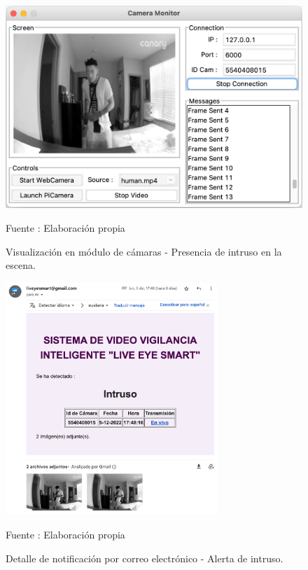 \begin{figure}[H]
    \begin{center}
        \includegraphics[width=12cm]{img/capitulo_6/human.png}
    \end{center}
    \begin{center}
        \caption{Visualización en módulo de cámaras - Presencia de intruso en la escena.}
        Fuente : Elaboración propia
    \end{center}
\end{figure}

\begin{figure}[H]
    \begin{center}
        \includegraphics[width=8cm]{img/capitulo_6/mail_human.png}
    \end{center}
    \begin{center}
        \caption{Detalle de notificación por correo electrónico - Alerta de intruso.}
        Fuente : Elaboración propia
    \end{center}
\end{figure}


